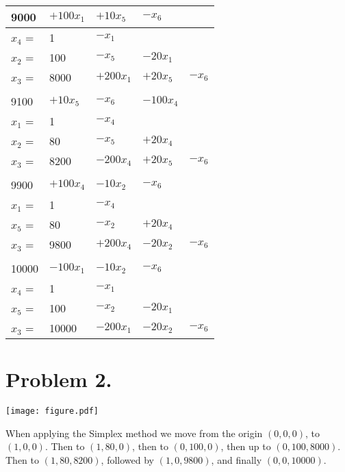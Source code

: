 \documentclass[12pt]{report}
\begin{document}
\begin{table}
\begin{center}
\begin{tabular}{ l l l l l }
  \\
  9000 & $+100x_1$ & $+10x_5$ & $-x_6$ \\  \hline

  $x_4$ = & 1 &  $-x_1$ \\ 
  $x_2$ = & 100 & $- x_5$ & $-20x_1$ \\ 
  $x_3$ = & 8000  & $+200x_1$ & $+20x_5$ & $-x_6$  \\ 

  \\
  9100 & $+10x_5$ & $-x_6$ & $-100x_4$  \\  \hline

  $x_1$ = & 1 &  $-x_4$ \\ 
  $x_2$ = & 80 & $- x_5$ & $+20x_4$ \\ 
  $x_3$ = & 8200  & $-200x_4$ & $+20x_5$ & $-x_6$  \\ 

  \\
  9900 & $+100x_4$ & $-10x_2$ & $-x_6$  \\  \hline

  $x_1$ = & 1 &  $-x_4$ \\ 
  $x_5$ = & 80 & $- x_2$ & $+20x_4$ \\ 
  $x_3$ = & 9800  & $+200x_4$ & $-20x_2$ & $-x_6$  \\ 

  \\
  10000 & $-100x_1$ & $-10x_2$ & $-x_6$   \\  \hline

  $x_4$ = & 1 &  $-x_1$ \\ 
  $x_5$ = & 100 & $- x_2$ & $-20x_1$ \\ 
  $x_3$ = & 10000  & $-200x_1$ & $-20x_2$ & $-x_6$  \\ 

\end{tabular}
\end{center}
\end{table}


\newpage

\section*{Problem 2.}

\texttt{[image: figure.pdf]}

When applying the Simplex method we move from the origin $(0,0,0)$, to $(1,0,0)$.
Then to $(1,80,0)$, then to $(0,100,0)$, then up to $(0,100,8000)$.
Then to $(1,80,8200)$, followed by $(1,0,9800)$, and finally $(0,0,10000)$. \\
\end{document}

